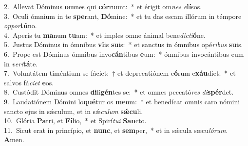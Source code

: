 {2.~}Allevat Dóminus \textbf{om}nes qui \textbf{cór}ruunt:~* et érigit om\textit{nes} \textit{e}\textbf{lí}sos.\\
{3.~}Oculi ómnium in te \textbf{spe}rant, \textbf{Dó}mine:~* et tu das escam illórum in témpore \textit{op}\textit{por}\textbf{tú}no.\\
{4.~}Aperis tu \textbf{ma}num \textbf{tu}am:~* et imples omne ánimal bene\textit{di}\textit{cti}\textbf{ó}ne.\\
{5.~}Justus Dóminus in ómnibus \textbf{vi}is \textbf{su}is:~* et sanctus in ómnibus opé\textit{ri}\textit{bus} \textbf{su}is.\\
{6.~}Prope est Dóminus ómnibus invo\textbf{cán}tibus \textbf{e}um:~* ómnibus invocántibus eum in \textit{ve}\textit{ri}\textbf{tá}te.\\
{7.~}Voluntátem timéntium se fáciet:~† et deprecatiónem e\textbf{ó}rum e\textbf{xáu}diet:~* et salvos fá\textit{ci}\textit{et} \textbf{e}os.\\
{8.~}Custódit Dóminus omnes \textbf{di}li\textbf{gén}tes se:~* et omnes peccató\textit{res} \textit{di}\textbf{spér}det.\\
{9.~}Laudatiónem Dómini lo\textbf{qué}tur os \textbf{me}um:~* et benedícat omnis caro nómini sancto ejus in sǽculum, et in sǽ\textit{cu}\textit{lum} \textbf{sǽ}\textbf{cu}li.\\
{10.~}Glória \textbf{Pa}tri, et \textbf{Fí}lio,~* et Spirí\textit{tu}\textit{i} \textbf{San}cto.\\
{11.~}Sicut erat in princípio, et \textbf{nunc}, et \textbf{sem}per,~* et in sǽcula sæcu\textit{ló}\textit{rum}. \textbf{A}men.\\
